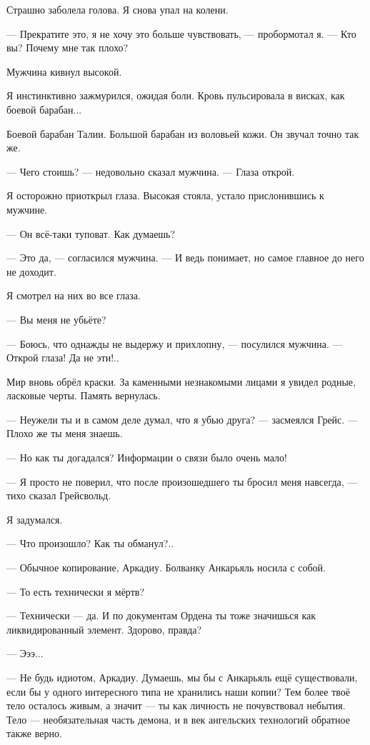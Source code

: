 Страшно заболела голова.
Я снова упал на колени.

--- Прекратите это, я не хочу это больше чувствовать, --- пробормотал я.
--- Кто вы?
Почему мне так плохо?

Мужчина кивнул высокой.

Я инстинктивно зажмурился, ожидая боли.
Кровь пульсировала в висках, как боевой барабан...

Боевой барабан Талии.
Большой барабан из воловьей кожи.
Он звучал точно так же.

--- Чего стоишь? --- недовольно сказал мужчина.
--- Глаза открой.

Я осторожно приоткрыл глаза.
Высокая стояла, устало прислонившись к мужчине.

--- Он всё-таки туповат.
Как думаешь?

--- Это да, --- согласился мужчина.
--- И ведь понимает, но самое главное до него не доходит.

Я смотрел на них во все глаза.

--- Вы меня не убьёте?

--- Боюсь, что однажды не выдержу и прихлопну, --- посулился мужчина.
--- Открой глаза!
Да не эти!..

Мир вновь обрёл краски.
За каменными незнакомыми лицами я увидел родные, ласковые черты.
Память вернулась.

--- Неужели ты и в самом деле думал, что я убью друга? --- засмеялся Грейс.
--- Плохо же ты меня знаешь.

--- Но как ты догадался?
Информации о связи было очень мало!

--- Я просто не поверил, что после произошедшего ты бросил меня навсегда, --- тихо сказал Грейсвольд.

Я задумался.

--- Что произошло?
Как ты обманул?..

--- Обычное копирование, Аркадиу.
Болванку Анкарьяль носила с собой.

--- То есть технически я мёртв?

--- Технически --- да.
И по документам Ордена ты тоже значишься как ликвидированный элемент.
Здорово, правда?

--- Эээ...

--- Не будь идиотом, Аркадиу.
Думаешь, мы бы с Анкарьяль ещё существовали, если бы у одного интересного типа не хранились наши копии?
Тем более твоё тело осталось живым, а значит --- ты как личность не почувствовал небытия.
Тело --- необязательная часть демона, и в век ангельских технологий обратное также верно.

